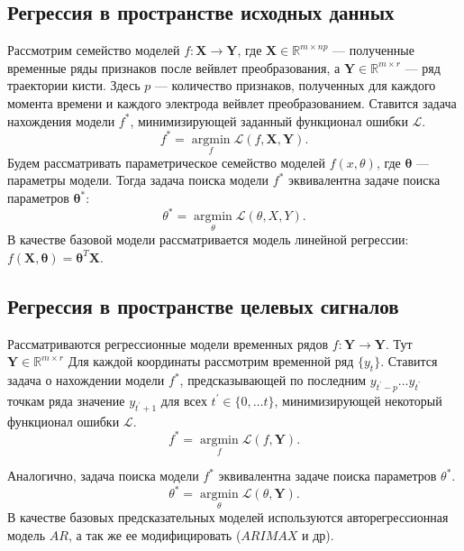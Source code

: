 \documentclass{article}
\newcommand{\argmin}{\mathop{\arg \min}\limits}
\begin{document}
\subsection{Регрессия в пространстве исходных данных}
Рассмотрим семейство моделей $f: \mathbf{X} \rightarrow \mathbf{Y}$, где $\mathbf{X} \in \mathbb{R}^{m \times np}$ --- полученные временные ряды признаков после вейвлет преобразования, а $\mathbf{Y} \in \mathbb{R}^{m \times r}$ --- ряд траектории кисти. Здесь $p$ --- количество признаков, полученных для каждого момента времени и каждого электрода вейвлет преобразованием. Ставится задача нахождения модели $f^*$,  минимизирующей заданный функционал ошибки $\mathcal{L}$.
\begin{equation}\label{eq1} 
	f^* = \argmin_f \mathcal{L}(f, \mathbf{X}, \mathbf{Y}).
\end{equation}
Будем рассматривать параметрическое семейство моделей $f(x, \theta)$, где $\mathbf{\theta}$ --- параметры модели. Тогда задача поиска модели $f^*$ эквивалентна задаче поиска параметров $\mathbf{\theta^*}$:
\begin{equation}\label{eq2} 
\theta^* = \argmin_{\theta} \mathcal{L}(\theta, X, Y).
\end{equation}
В качестве базовой модели рассматривается модель линейной регрессии: $f(\mathbf{X}, \mathbf{\theta}) = \mathbf{\theta}^T\mathbf{X}$.
\subsection{Регрессия в пространстве целевых сигналов}
Рассматриваются регрессионные модели временных рядов $f : \mathbf{Y} \rightarrow \mathbf{Y}$. Тут $\mathbf{Y} \in  \mathbb{R}^{m \times r}$ Для каждой координаты рассмотрим временной ряд $\{y_t\}$. Ставится задача о нахождении модели $f^*$, предсказывающей по последним $y_{t^{'}-p} \dots y_{t^{'}}$ точкам ряда значение $y_{t^{'}+1}$ для всех $t^{'} \in \{0, \dots t\}$, минимизирующей некоторый функционал ошибки $ \mathcal{L}$.
\begin{equation}\label{eq3} 
	f^* = \argmin_f \mathcal{L}(f, \mathbf{Y}).
\end{equation}

Аналогично, задача поиска модели $f^*$ эквивалентна задаче поиска параметров $\theta^*$.
\begin{equation}\label{eq4} 
\theta^* = \argmin_{\theta} \mathcal{L}(\theta, \mathbf{Y}).
\end{equation}
В качестве базовых предсказательных моделей используются авторегрессионная модель $AR$, а так же ее модифицировать ($ARIMAX$ \cite{7514029} и др).
\end{document}
